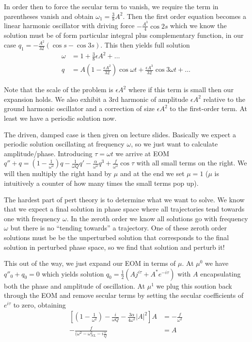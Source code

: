 \documentclass[10pt]{report}
\newcommand{\abs}[1]{\left|#1\right|}
\begin{document}
In order then to force the secular term to vanish, we require the term in parentheses vanish and obtain $\omega_1 = \frac{3}{8}A^2$. Then the first order equation becomes a linear harmonic oscillator with driving force $-\frac{A^3}{4}\cos 2s$ which we know the solution must be of form particular integral plus complementary function, in our case $q_1 = -\frac{A^2}{32}\left( \cos s - \cos 3s \right)$. This then yields full solution
\begin{align}
    \omega &= 1 + \frac{3}{8}\epsilon A^2 +\dots\\
    q &= A\left( 1-\frac{\epsilon A^2}{32} \right)\cos \omega t + \frac{\epsilon A^3}{32}\cos 3\omega t +\dots
    \label{1.21.LPapprox}
\end{align}

Note that the scale of the problem is $\epsilon A^2$ where if this term is small then our expansion holds. We also exhibit a 3rd harmonic of amplitude $\epsilon A^2$ relative to the ground harmonic oscillator and a correction of size $\epsilon A^2$ to the first-order term. At least we have a periodic solution now. 

The driven, damped case is then given on lecture slides. Basically we expect a periodic solution oscillating at frequency $\omega$, so we just want to calculate amplitude/phase. Introducing $\tau = \omega t$ we arrive at EOM $q'' + q = \left( 1-\frac{1}{\omega^2} \right)q - \frac{1}{\omega Q}q' - \frac{\alpha}{\omega^2}q^3 + \frac{f}{\omega^2}\cos \tau$ with all small terms on the right. We will then multiply the right hand by $\mu$ and at the end we set $\mu = 1$ ($\mu$ is intuitively a counter of how many times the small terms pop up). 

The hardest part of pert theory is to determine what we want to solve. We know that we expect a final solution in phase space where all trajectories tend towards one with frequency $\omega$. In the zeroth order we know all solutions go with frequency $\omega$ but there is no ``tending towards'' a trajectory. One of these zeroth order solutions must be be the unperturbed solution that corresponds to the final solution in perturbed phase space, so we find that solution and perturb it! 

This out of the way, we just expand our EOM in terms of $\mu$. At $\mu^0$ we have $q''_0 + q_0 = 0$ which yields solution $q_0 = \frac{1}{2}\left( Aj^{i\tau} + A^*e^{-i\tau} \right)$ with $A$ encapsulating both the phase and amplitude of oscillation. At $\mu^1$ we plug this soution back through the EOM and remove secular terms by setting the secular coefficients of $e^{i\tau}$ to zero, obtaining 
\begin{align}
    \left[ \left( 1-\frac{1}{\omega^2} \right) - \frac{i}{\omega Q} - \frac{3\alpha}{4\omega^2}\abs{A}^2 \right]A &= -\frac{f}{\omega^2}\\
    -\frac{f}{(\omega^2 - \omega_{NL}^2 - i\frac{\omega}{Q}} &= A
\end{align}
\end{document}
